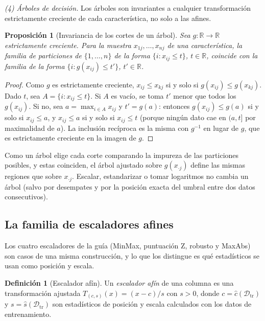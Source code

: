 \documentclass[11pt]{article}
\newtheorem{proposicion}[teorema]{Proposición}
\theoremstyle{definition}
\newtheorem{definicion}[teorema]{Definición}
\theoremstyle{remark}
\newcommand{\R}{\mathbb{R}}
\newcommand{\Dtr}{\mathcal{D}_{\mathrm{tr}}}
\begin{document}
\medskip

\noindent \emph{(4) Árboles de decisión.} Los árboles son invariantes a cualquier transformación estrictamente creciente de cada característica, no solo a las afines.

\begin{proposicion}[Invariancia de los cortes de un árbol]\label{prop:arbol-inv}
\noindent Sea $g:\R\to\R$ estrictamente creciente. Para la muestra $x_{1j},\dots,x_{nj}$ de una característica, la familia de particiones de $\{1,\dots,n\}$ de la forma $\{i:x_{ij}\le t\}$, $t\in\R$, coincide con la familia de la forma $\{i:g(x_{ij})\le t'\}$, $t'\in\R$.
\end{proposicion}
\begin{proof}
\noindent Como $g$ es estrictamente creciente, $x_{ij}\le x_{kj}$ si y solo si $g(x_{ij})\le g(x_{kj})$. Dado $t$, sea $A=\{i:x_{ij}\le t\}$. Si $A$ es vacío, se toma $t'$ menor que todos los $g(x_{ij})$. Si no, sea $a=\max_{i\in A}x_{ij}$ y $t'=g(a)$: entonces $g(x_{ij})\le g(a)$ si y solo si $x_{ij}\le a$, y $x_{ij}\le a$ si y solo si $x_{ij}\le t$ (porque ningún dato cae en $(a,t]$ por maximalidad de $a$). La inclusión recíproca es la misma con $g^{-1}$ en lugar de $g$, que es estrictamente creciente en la imagen de $g$.
\end{proof}

\noindent Como un árbol elige cada corte comparando la impureza de las particiones posibles, y estas coinciden, el árbol ajustado sobre $g(x_{\cdot j})$ define las mismas regiones que sobre $x_{\cdot j}$. Escalar, estandarizar o tomar logaritmos no cambia un árbol (salvo por desempates y por la posición exacta del umbral entre dos datos consecutivos).

\subsection{La familia de escaladores afines}\label{sec:afines}

\noindent Los cuatro escaladores de la guía (MinMax, puntuación Z, robusto y MaxAbs) son casos de una misma construcción, y lo que los distingue es qué estadísticos se usan como posición y escala.

\begin{definicion}[Escalador afín]\label{def:afin}
\noindent Un \emph{escalador afín} de una columna es una transformación ajustada $T_{(c,s)}(x)=(x-c)/s$ con $s>0$, donde $c=\hat c(\Dtr)$ y $s=\hat s(\Dtr)$ son estadísticos de posición y escala calculados con los datos de entrenamiento.
\end{definicion}
\end{document}
